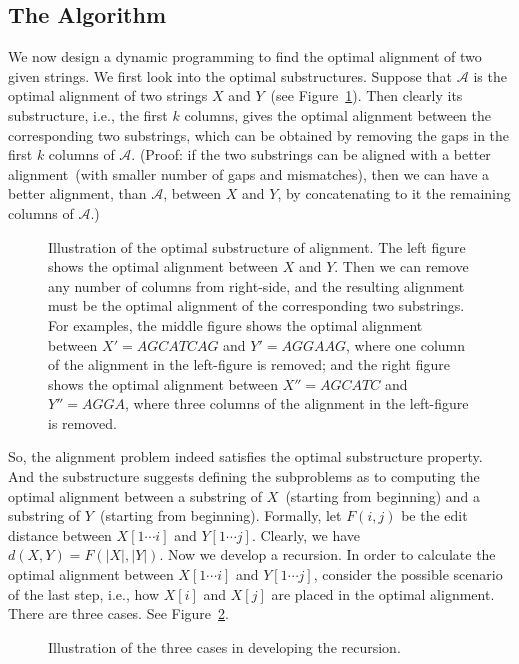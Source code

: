 \documentclass[letterpaper,11pt]{article}
\theoremstyle{mytheorem}
\begin{document}
\subsection*{The Algorithm}

We now design a dynamic programming to find the optimal alignment of two given strings.
We first look into the optimal substructures. Suppose that $\mathcal{A}$ is the optimal
alignment of two strings $X$ and $Y$~(see Figure~\ref{fig:optimal}).
Then clearly its substructure, i.e., the first $k$ columns, gives the optimal
alignment between the corresponding two substrings, which can be obtained by removing
the gaps in the first $k$ columns of $\mathcal{A}$.
(Proof: if the two substrings can be aligned with
a better alignment~(with smaller number of gaps and mismatches), then we can have
a better alignment, than $\mathcal{A}$, between $X$ and $Y$,
by concatenating to it the remaining columns of $\mathcal{A}$.)

\begin{figure}[h]
\centering{}
\caption{Illustration of the optimal substructure of alignment.
The left figure shows the optimal alignment between $X$ and $Y$.
Then we can remove any number of columns from right-side, and the resulting
alignment must be the optimal alignment of the corresponding two substrings.
For examples, the middle figure shows the optimal alignment between $X' = AGCATCAG$ and $Y' = AGGAAG$,
where one column of the alignment in the left-figure is removed;
and the right figure shows the optimal alignment between $X'' = AGCATC$ and $Y'' = AGGA$,
where three columns of the alignment in the left-figure is removed.}
\label{fig:optimal}
\end{figure}

So, the alignment problem indeed satisfies the optimal substructure property.
And the substructure suggests defining the subproblems as to computing the optimal
alignment between a substring of $X$~(starting from beginning) and 
a substring of $Y$~(starting from beginning).
Formally, let $F(i,j)$ be the edit distance between $X[1\cdots i]$ and $Y[1\cdots j]$.
Clearly, we have $d(X, Y) = F(|X|, |Y|)$.
Now we develop a recursion. In order to calculate the optimal alignment between $X[1\cdots i]$
and $Y[1\cdots j]$, consider the possible scenario of the last step, i.e., how $X[i]$ and $X[j]$
are placed in the optimal alignment. There are three cases. See Figure~\ref{fig:recursion}.

\begin{figure}[h]
\centering{}
\caption{Illustration of the three cases in developing the recursion.}
\label{fig:recursion}
\end{figure}
\end{document}

